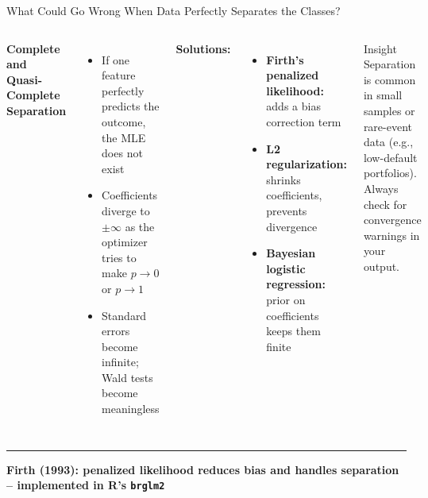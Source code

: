 \documentclass[8pt,aspectratio=169]{beamer}
\newcommand{\bottomnote}[1]{%
\vfill
\vspace{-2mm}
\textcolor{mllavender2}{\rule{\textwidth}{0.4pt}}
\vspace{1mm}
\footnotesize
\textbf{#1}
}
\newenvironment{compactlist}{%
  \begin{itemize}%
    \setlength{\itemsep}{2pt}%
    \setlength{\parskip}{0pt}%
    \setlength{\parsep}{0pt}%
}{%
  \end{itemize}%
}
\begin{document}
\begin{frame}[t]{What Could Go Wrong When Data Perfectly Separates the Classes?}
\begin{columns}[T]
\small
\textbf{Complete and Quasi-Complete Separation}

\begin{compactlist}
\item If one feature perfectly predicts the outcome, the MLE does not exist
\item Coefficients diverge to $\pm\infty$ as the optimizer tries to make $p \to 0$ or $p \to 1$
\item Standard errors become infinite; Wald tests become meaningless
\end{compactlist}

\vspace{1mm}
\scriptsize
\textbf{Solutions:}
\begin{compactlist}
\item \textbf{Firth's penalized likelihood:} adds a bias correction term
\item \textbf{L2 regularization:} shrinks coefficients, prevents divergence
\item \textbf{Bayesian logistic regression:} prior on coefficients keeps them finite
\end{compactlist}

\begin{block}{Insight}
\scriptsize Separation is common in small samples or rare-event data (e.g., low-default portfolios). Always check for convergence warnings in your output.
\end{block}

\end{columns}

\bottomnote{Firth (1993): penalized likelihood reduces bias and handles separation -- implemented in R's \texttt{brglm2}}
\end{frame}
\end{document}
